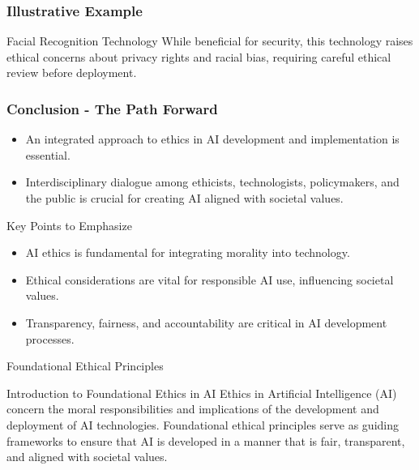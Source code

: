\documentclass[aspectratio=169]{beamer}
\begin{document}
\begin{frame}[fragile]
    \frametitle{Illustrative Example}
    \begin{block}{Facial Recognition Technology}
        While beneficial for security, this technology raises ethical concerns about privacy rights and racial bias, requiring careful ethical review before deployment.
    \end{block}
\end{frame}

\begin{frame}[fragile]
    \frametitle{Conclusion - The Path Forward}
    \begin{itemize}
        \item An integrated approach to ethics in AI development and implementation is essential.
        \item Interdisciplinary dialogue among ethicists, technologists, policymakers, and the public is crucial for creating AI aligned with societal values.
    \end{itemize}
    
    \begin{block}{Key Points to Emphasize}
        \begin{itemize}
            \item AI ethics is fundamental for integrating morality into technology.
            \item Ethical considerations are vital for responsible AI use, influencing societal values.
            \item Transparency, fairness, and accountability are critical in AI development processes.
        \end{itemize}
    \end{block}
\end{frame}

\begin{frame}[fragile]{Foundational Ethical Principles}
    \begin{block}{Introduction to Foundational Ethics in AI}
        Ethics in Artificial Intelligence (AI) concern the moral responsibilities and implications of the development and deployment of AI technologies. Foundational ethical principles serve as guiding frameworks to ensure that AI is developed in a manner that is fair, transparent, and aligned with societal values.
    \end{block}
\end{frame}
\end{document}
